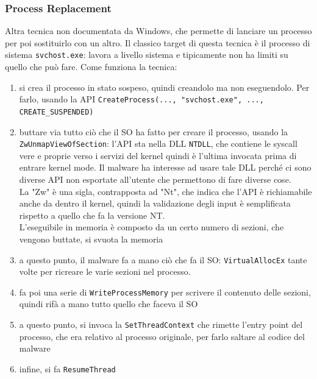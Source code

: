 \documentclass[12pt, oneside]{extbook}
\begin{document}
\subsubsection{Process Replacement}
Altra tecnica non documentata da Windows, che permette di lanciare un processo per poi sostituirlo con un altro. Il classico target di questa tecnica è il processo di sistema \texttt{svchost.exe}: lavora a livello sistema e tipicamente non ha limiti su quello che può fare. Come funziona la tecnica:
\begin{enumerate}
	\item si crea il processo in stato sospeso, quindi creandolo ma non eseguendolo. Per farlo, usando la API \texttt{CreateProcess(..., "svchost.exe", ..., CREATE\_SUSPENDED)}
	\item buttare via tutto ciò che il SO ha fatto per creare il processo, usando la \texttt{ZwUnmapViewOfSection}: l'API sta nella DLL \texttt{NTDLL}, che contiene le syscall vere e proprie verso i servizi del kernel quindi è l'ultima invocata prima di entrare kernel mode. Il malware ha interesse ad usare tale DLL perché ci sono diverse API non esportate all'utente che permettono di fare diverse cose.\\La "Zw" è una sigla, contrapposta ad "Nt", che indica che l'API è richiamabile anche da dentro il kernel, quindi la validazione degli input è semplificata rispetto a quello che fa la versione NT.\\L'eseguibile in memoria è composto da un certo numero di sezioni, che vengono buttate, si svuota la memoria
	\item a questo punto, il malware fa a mano ciò che fa il SO: \texttt{VirtualAllocEx} tante volte per ricreare le varie sezioni nel processo.
	\item fa poi una serie di \texttt{WriteProcessMemory} per scrivere il contenuto delle sezioni, quindi rifà a mano tutto quello che faceva il SO
	\item a questo punto, si invoca la \texttt{SetThreadContext} che rimette l'entry point del processo, che era relativo al processo originale, per farlo saltare al codice del malware
	\item infine, si fa \texttt{ResumeThread}
\end{enumerate}
\end{document}
